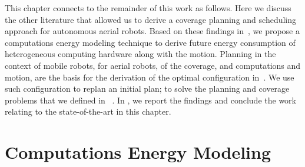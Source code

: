 This chapter connects to the remainder of this work as follows. Here we discuss the other literature that allowed us to derive a coverage planning and scheduling approach for autonomous aerial robots. Based on these findings in~, we propose a computations energy modeling technique to derive future energy consumption of heterogeneous computing hardware along with the motion. Planning in the context of mobile robots, for aerial robots, of the coverage, and computations and motion, are the basis for the derivation of the optimal configuration in~. We use such configuration to replan an initial plan; to solve the planning and coverage problems that we defined in ~. In , we report the findings and conclude the work relating to the state-of-the-art in this chapter.



\section{Computations Energy Modeling}
\label{sec:soa-ene-mod}

